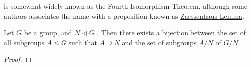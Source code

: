 \documentclass[notoc,notitlepage,nobib]{tufte-book}
\begin{document}
 is somewhat widely known 
as the Fourth Isomorphism Theorem, although some authors associates
the name with a proposition known as 
\href{https://en.wikipedia.org/wiki/Zassenhaus_lemma}{Zaessenhaus Lemma}.

\begin{thm}\label{thm:correspondence_theorem}
  Let $G$ be a group, and $N \triangleleft G$
  . Then there exists a bijection between
  the set of all subgroups $A \leq G$ such that $A \supseteq N$
  and the set of subgroups $A / N$ of $G / N$.
\end{thm}

\begin{proof}
\end{proof}




\backmatter

\pagestyle{plain}

% 

\printindex
\end{document}
